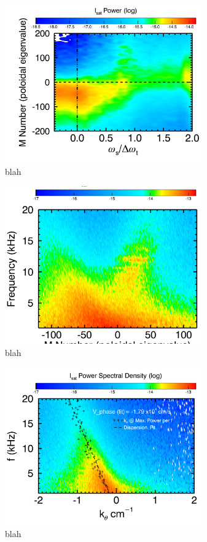 \documentclass[aip,pop,amsmath,amssymb,preprint,superscriptaddress]{revtex4-1} %
\begin{document}
\begin{figure}[!htbp]
\centerline{
\includegraphics[width=8.5cm]{m_spec_vs_bias}}
\caption{\label{fig:m_spec_vs_bias} blah}
\end{figure}

\begin{figure}[!htbp]
\centerline{
\includegraphics[width=8.5cm]{m_spec_vs_freq}}
\caption{\label{fig:m_spec_vs_freq} blah}
\end{figure}

\begin{figure}[!htbp]
\centerline{
\includegraphics[width=8.5cm]{k_spec_vs_freq_lowbias}}
\caption{\label{fig:k_spec_vs_bias_lowbias} blah}
\end{figure}
\end{document}
